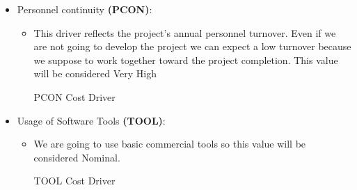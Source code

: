 \begin{itemize}
	\item Personnel continuity \textbf{(PCON)}: 
	\begin{itemize}
	\item[] This driver reflects the project's annual personnel turnover. Even if we are not going to develop the project we can expect a low turnover because we suppose to work together toward the project completion. This value will be considered \textsf{Very High}
	\begin{costdriverstable}{PCON Cost Driver}
		\hline	
	\end{costdriverstable}
	\end{itemize}
\end{itemize}
\newpage
\begin{itemize}
	\item Usage of Software Tools \textbf{(TOOL)}: 
	\begin{itemize}
	\item[] We are going to use basic commercial tools so this value will be considered \textsf{Nominal}.
	\begin{costdriverstable}{TOOL Cost Driver}
		\hline
	\end{costdriverstable}
	\end{itemize}
\end{itemize}

